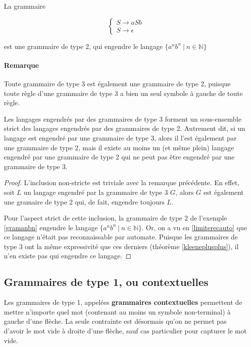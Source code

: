 \begin{example}
\label{gramanbn}
La grammaire 

\[
\begin{cases}
S \rightarrow aSb \\
S \rightarrow \epsilon
\end{cases}
\]

est une grammaire de type 2, qui engendre le langage $\{a^nb^n ~|~n \in \mathbb{N}\}$
\end{example}

\paragraph{Remarque} Toute grammaire de type 3 est également une grammaire de type 2, puisque toute règle d'une grammaire de type 3 a bien un seul symbole à gauche de toute règle.

\begin{lemma}
Les langages engendrés par des grammaires de type 3 forment un sous-ensemble strict des langages engendrés par des grammaires de type 2. Autrement dit, si un langage est engendré par une grammaire de type 3, alors il l'est également par une grammaire de type 2, mais il existe au moins un (et même plein) langage engendré par une grammaire de type 2 qui ne peut pas être engendré par une grammaire de type 3.  
\end{lemma}

\begin{proof}
L'inclusion non-stricte est triviale avec la remarque précédente. En effet, soit $L$ un langage engendré par la grammaire de type 3 $G$, alors $G$ est également une gramaire de type 2 qui, de fait, engendre toujours $L$.

Pour l'aspect strict de cette inclusion, la grammaire de type 2 de l'exemple \ref{gramanbn} engendre le langage $\{a^nb^n ~|~ n \in \mathbb{N}\}$. Or, on a vu en \ref{limiterecauto} que ce langage n'était pas reconnaissable par automate. Puisque les grammaires de type 3 ont la même expressivité que ces derniers (théorème \ref{kleeneplusplus}), il n'en existe pas qui engendre ce langage.
\end{proof}




\subsection{Grammaires de type 1, ou contextuelles}

Les grammaires de type 1, appelées \textbf{grammaires contextuelles} permettent de mettre n'importe quel mot (contenant au moins un symbole non-terminal) à gauche d'une flèche. La seule contrainte est désormais qu'on ne permet pas d'avoir le mot vide à droite d'une flèche, sauf cas particulier pour capturer le mot vide.

